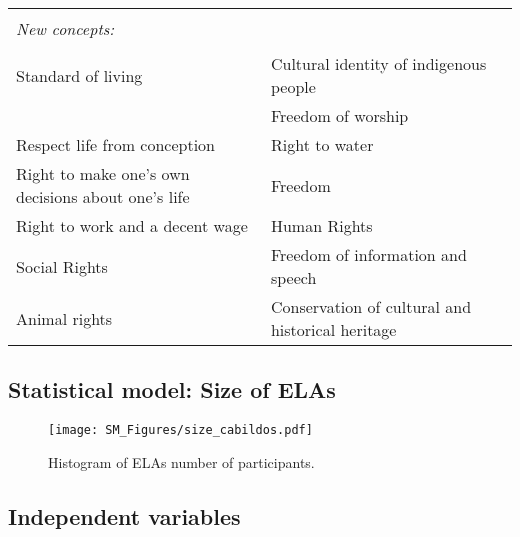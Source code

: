 \documentclass[onecolumn]{article}
\begin{document}
\begin{table}[!htbp]
\begin{tabular}{ll}
\hline \\[-1.8ex] 
\textit{New concepts:} & \\
\hline \\[-1.8ex] 
Standard of living  &  Cultural identity of indigenous people \\
 & Freedom of worship \\
Respect life from conception & Right to water \\
Right to make one's own decisions about one's life & Freedom \\
Right to work and a decent wage & Human Rights \\
Social Rights & Freedom of information and speech \\
Animal rights & Conservation of cultural and historical heritage\\
\hline
\hline
\end{tabular}
\end{table}

\pagebreak
\clearpage

\subsection{Statistical model: Size of ELAs}

\begin{figure}[!h]
\centering
\texttt{[image: SM\_Figures/size\_cabildos.pdf]}
\caption{Histogram of ELAs number of participants.}
\label{fig:size_elas}
\end{figure}
  
\pagebreak
\clearpage

\subsection{Independent variables}\label{SMet2}
\end{document}

